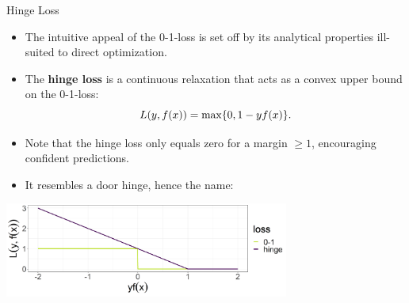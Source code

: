 \begin{vbframe}{Hinge Loss}

\begin{itemize}
  \item The intuitive appeal of the 0-1-loss is set off by its analytical
  properties ill-suited to direct optimization.
  \item The \textbf{hinge loss} is a continuous relaxation that acts as a convex 
  upper bound on the 0-1-loss: 
  $$L(y, f(x)) = \max \{ 0, 1 - yf(x) \}.$$
  \item Note that the hinge loss only equals zero for a margin $\geq 1$, 
  encouraging confident predictions.
  \item It resembles a door hinge, hence the name:
\end{itemize}

\begin{center}
\includegraphics[width = 0.7\textwidth]{figure/plot_loss_hinge.png}
\end{center}

\end{vbframe}

\endlecture

